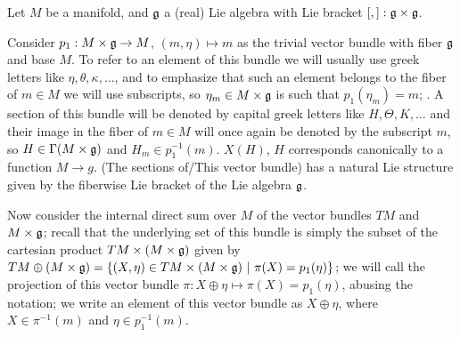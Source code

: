Let $M$ be a manifold, and $\mathfrak{g}$ a (real) Lie algebra with Lie bracket $[,]: \mathfrak{g} \times \mathfrak{g}$. 

Consider $p_1: M \times \mathfrak{g} \to M$, $(m, \eta) \mapsto m$ as the trivial vector bundle with fiber $\mathfrak{g}$ and base $M$. To refer to an element of this bundle we will usually use greek letters like $\eta, \theta, \kappa, \dots$, and to emphasize that such an element belongs to the fiber of $m \in M$ we will use subscripts, so $\eta_m \in M \times \mathfrak{g}$ is such that $p_1(\eta_m) = m$; . A section of this bundle will be denoted by capital greek letters like $H, \Theta, K, \dots$ and their image in the fiber of $m \in M$ will once again be denoted by the subscript $m$, so $H \in \Gamma(M \times \mathfrak{g})$ and $H_m \in p_1^{-1}(m)$. $X(H)$, $H$ corresponds canonically to a function $M \to g$. (The sections of/This vector bundle) has a natural Lie structure given by the fiberwise Lie bracket of the Lie algebra $\mathfrak{g}$.

Now consider the internal direct sum over $M$ of the vector bundles $TM$ and $M \times \mathfrak{g}$; recall  that the underlying set of this bundle is simply the subset of the cartesian product $TM \times (M \times \mathfrak{g})$ given by $TM \oplus (M \times \mathfrak{g}) = \{(X, \eta) \in TM \times (M \times \mathfrak{g}) \operatorname{\,|\,} \pi(X) = p_1(\eta)\}$; we will call the projection of this vector bundle $\pi: X \oplus \eta \mapsto \pi(X) = p_1(\eta)$, abusing the notation; we write an element of this vector bundle as $X \oplus \eta$, where $X \in \pi^{-1}(m)$ and $\eta \in p_1^{-1}(m)$.

